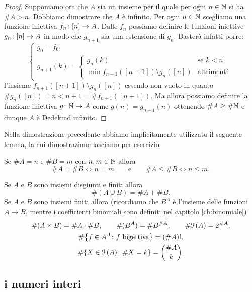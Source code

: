 \begin{proof}
Supponiamo ora che $A$ sia un insieme per il quale per ogni $n\in {\mathbb N}$ 
si ha $\#A > n$. Dobbiamo dimostrare che $A$ è infinito.
Per ogni $n\in {\mathbb N}$ scegliamo%
una funzione iniettiva $f_n\colon{\left[ n \right]}\to A$.
Dalle $f_n$ possiamo definire le funzioni iniettive $g_n\colon {\left[ n \right]}\to A$
in modo che $g_{n+1}$ sia una estensione di $g_n$.
Basterà infatti porre:
\[
  \begin{cases}
  g_0 = f_0,\\
  g_{n+1}(k) = \begin{cases}
    g_n(k) &\text{se $k<n$}\\
    \min f_{n+1}([n+1])\setminus g_n([n]) & \text{altrimenti}
    \end{cases}
  \end{cases}
\]
l'insieme $f_{n+1}([n+1])\setminus g_n([n])$ essendo non vuoto 
in quanto $\# g_n([n]) = n < n+1 = \# f_{n+1}([n+1])$.
Ma allora possiamo definire la funzione iniettiva $g\colon {\mathbb N} \to A$
come $g(n) = g_{n+1}(n)$ ottenendo $\#A \ge \#{\mathbb N}$ e dunque $A$ 
è Dedekind infinito.
\end{proof}

Nella dimostrazione precedente abbiamo implicitamente utilizzato il seguente lemma,
la cui dimostrazione lasciamo per esercizio.
\begin{lemma}
  Se $\#A = n$ e $\#B = m$ con $n,m\in {\mathbb N}$ allora 
  \[
    \#A = \#B \iff n=m
    \qquad \text{e}\qquad
    \#A \le \#B \iff n \le m.
  \]
\end{lemma}


\begin{exercise}
  \label{th:combinatoria}
  Se $A$ e $B$ sono insiemi disgiunti e finiti allora  
  \[
    \#(A\cup B) = \#A + \#B.
  \]
  Se $A$ e $B$ sono insiemi finiti allora 
  (ricordiamo che $B^A$ è l'insieme delle funzioni $A\to B$,
  mentre i coefficienti binomiali sono definiti nel capitolo
  \ref{ch:binomiale})
  \begin{gather*}
    \#(A \times B) = \#A\cdot \#B, \qquad
    \#(B^A) = \#B^{\#A}, \qquad
    \#\mathcal P(A) = 2^{\# A}, \\
    \#{\left\{ f\in A^A\colon \text{$f$ bigettiva} \right\}} = (\#A)!, \\
     \#{\left\{ X\in \mathcal P(A)\colon \#X = k \right\}}  
     = {\#A \choose k}. 
  \end{gather*}
\end{exercise}

\subsection{i numeri interi}

